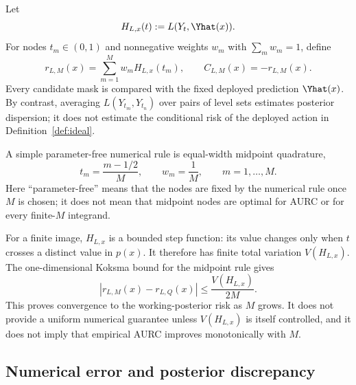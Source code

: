 Let
\begin{equation*}
  H_{L,x}(t):=L(Y_t,\Yhat(x)).
\end{equation*}
For nodes $t_m\in(0,1)$ and nonnegative weights $w_m$ with
$\sum_m w_m=1$, define
\begin{equation}\label{eq:quad}
  r_{L,M}(x)=\sum_{m=1}^M w_m H_{L,x}(t_m),
  \qquad
  C_{L,M}(x)=-r_{L,M}(x).
\end{equation}
Every candidate mask is compared with the fixed deployed prediction $\Yhat(x)$.
By contrast, averaging $L(Y_{t_m},Y_{t_n})$ over pairs of level sets estimates
posterior dispersion; it does not estimate the conditional risk of the deployed
action in Definition~\ref{def:ideal}.

A simple parameter-free numerical rule is equal-width midpoint quadrature,
\begin{equation}\label{eq:midpoint-nodes}
  t_m=\frac{m-1/2}{M},
  \qquad
  w_m=\frac1M,
  \qquad m=1,\ldots,M.
\end{equation}
Here ``parameter-free'' means that the nodes are fixed by the numerical rule once
$M$ is chosen; it does not mean that midpoint nodes are optimal for AURC or for every
finite-$M$ integrand.

For a finite image, $H_{L,x}$ is a bounded step function: its value changes only
when $t$ crosses a distinct value in $p(x)$. It therefore has finite total variation
$V(H_{L,x})$. The one-dimensional Koksma bound for the midpoint rule gives
\begin{equation}\label{eq:koksma}
  \left|r_{L,M}(x)-r_{L,Q}(x)\right|
  \leq \frac{V(H_{L,x})}{2M}.
\end{equation}
This proves convergence to the working-posterior risk as $M$ grows. It does not
provide a uniform numerical guarantee unless $V(H_{L,x})$ is itself controlled, and
it does not imply that empirical AURC improves monotonically with $M$.

\subsection{Numerical error and posterior discrepancy}\label{sec:error}

